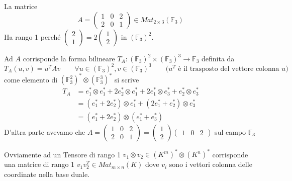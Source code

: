 \documentclass[../main.tex]{subfiles}
\begin{document}
\begin{example}
    La matrice
    \begin{equation*}
        A = \begin{pmatrix}
            1 & 0 & 2 \\
            2 & 0 & 1
        \end{pmatrix} \in Mat_{2 \times 3}(\mathbb{F}_3)
    \end{equation*}
    Ha rango 1 perché
    $\begin{pmatrix}
            2 \\
            1
        \end{pmatrix} = 2
        \begin{pmatrix}
            1 \\
            2
        \end{pmatrix}$ in $(\mathbb{F}_3)^2$.

    Ad $A$ corrisponde la forma bilineare $T_A: (\mathbb{F}_3)^2 \times (\mathbb{F}_3)^3 \rightarrow \mathbb{F}_3$ definita da
    \begin{equation*}
        T_A(u, v) = u^T A v \qquad \forall u \in (\mathbb{F}_3)^2, v \in (\mathbb{F}_3)^3 \qquad \text{($u^T$ è il trasposto del vettore colonna $u$)}
    \end{equation*}
    come elemento di $(\mathbb{F}_3^2)^* \otimes (\mathbb{F}_3^3)^*$ si scrive
    \begin{align*}
        T_A & = e_1^* \otimes e_1^* + 2 e_2^* \otimes e_1^* + 2 e_1^* \otimes e_3^* + e_2^* \otimes e_3^* \\
            & = (e_1^* + 2 e_2^*) \otimes e_1^* + (2 e_1^* + e_2^*) \otimes e_3^*                         \\
            & = (e_1^* + 2 e_2^*) \otimes (e_1^* + e_3^*)
    \end{align*}
    D'altra parte avevamo che $A = \begin{pmatrix}
            1 & 0 & 2 \\
            2 & 0 & 1
        \end{pmatrix} = \begin{pmatrix}
            1 \\
            2
        \end{pmatrix} \begin{pmatrix}
            1 & 0 & 2
        \end{pmatrix}$ sul campo $\mathbb{F}_3$
\end{example}

Ovviamente ad un Tensore di rango 1 $v_1 \otimes v_2 \in (K^m)^* \otimes (K^n)^*$ corrisponde una matrice di rango 1 $v_1 v_2^T \in Mat_{m \times n}(K)$ dove $v_i$ sono i vettori colonna delle coordinate nella base duale.
\end{document}
